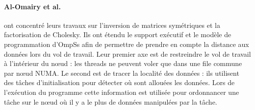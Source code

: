\paragraph{Al-Omairy et al.~\cite{Al-Omairy2015}} ont concentré leurs travaux sur l'inversion de matrices symétriques et la factorisation de Cholesky.
Ils ont étendu le support exécutif et le modèle de programmation d'OmpSs afin de permettre de prendre en compte la distance aux données lors du vol de travail.
Leur premier axe est de restreindre le vol de travail à l'intérieur du nœud : les threads ne peuvent voler que dans une file commune par nœud NUMA.
Le second est de tracer la localité des données : ils utilisent des tâches d'initialisation pour détecter où sont allouées les données. Lors de l'exécution du programme cette information est utilisée pour ordonnancer une tâche sur le nœud où il y a le plus de données manipulées par la tâche.


